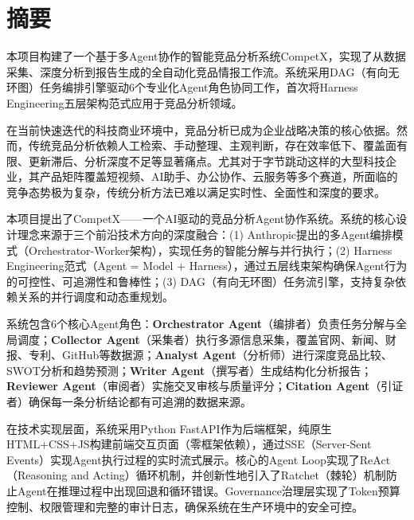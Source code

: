 \documentclass[12pt,a4paper]{ctexrep}
\begin{document}
\tableofcontents
\clearpage
\listoffigures
\clearpage
\listoftables
\clearpage
{}

\chapter*{摘\quad 要}

\begin{keypoint}
本项目构建了一个基于多Agent协作的智能竞品分析系统CompetX，实现了从数据采集、深度分析到报告生成的全自动化竞品情报工作流。系统采用DAG（有向无环图）任务编排引擎驱动6个专业化Agent角色协同工作，首次将Harness Engineering五层架构范式应用于竞品分析领域。
\end{keypoint}

\vspace{0.5cm}

在当前快速迭代的科技商业环境中，竞品分析已成为企业战略决策的核心依据。然而，传统竞品分析依赖人工检索、手动整理、主观判断，存在效率低下、覆盖面有限、更新滞后、分析深度不足等显著痛点。尤其对于字节跳动这样的大型科技企业，其产品矩阵覆盖短视频、AI助手、办公协作、云服务等多个赛道，所面临的竞争态势极为复杂，传统分析方法已难以满足实时性、全面性和深度的要求。

本项目提出了CompetX——一个AI驱动的竞品分析Agent协作系统。系统的核心设计理念来源于三个前沿技术方向的深度融合：(1) Anthropic提出的多Agent编排模式（Orchestrator-Worker架构），实现任务的智能分解与并行执行；(2) Harness Engineering范式（Agent = Model + Harness），通过五层线束架构确保Agent行为的可控性、可追溯性和鲁棒性；(3) DAG（有向无环图）任务流引擎，支持复杂依赖关系的并行调度和动态重规划。

系统包含6个核心Agent角色：\textbf{Orchestrator Agent}（编排者）负责任务分解与全局调度；\textbf{Collector Agent}（采集者）执行多源信息采集，覆盖官网、新闻、财报、专利、GitHub等数据源；\textbf{Analyst Agent}（分析师）进行深度竞品比较、SWOT分析和趋势预测；\textbf{Writer Agent}（撰写者）生成结构化分析报告；\textbf{Reviewer Agent}（审阅者）实施交叉审核与质量评分；\textbf{Citation Agent}（引证者）确保每一条分析结论都有可追溯的数据来源。

在技术实现层面，系统采用Python FastAPI作为后端框架，纯原生HTML+CSS+JS构建前端交互页面（零框架依赖），通过SSE（Server-Sent Events）实现Agent执行过程的实时流式展示。核心的Agent Loop实现了ReAct（Reasoning and Acting）循环机制，并创新性地引入了Ratchet（棘轮）机制防止Agent在推理过程中出现回退和循环错误。Governance治理层实现了Token预算控制、权限管理和完整的审计日志，确保系统在生产环境中的安全可控。
\end{document}
